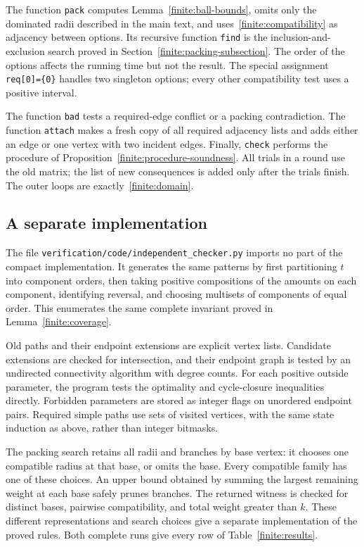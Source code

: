 The function \texttt{pack} computes
Lemma~\ref{finite:ball-bounds}, omits only the dominated radii described
in the main text, and uses~\eqref{finite:compatibility} as adjacency
between options. Its recursive function \texttt{find} is the
inclusion-and-exclusion search proved in Section~\ref{finite:packing-subsection}.
The order of the options affects the running time but not the result.
The special assignment \texttt{req[0]=\{0\}} handles two singleton
options; every other compatibility test uses a positive interval.

The function \texttt{bad} tests a required-edge conflict or a packing
contradiction. The function \texttt{attach} makes a fresh copy of all
required adjacency lists and adds either an edge or one vertex with
two incident edges. Finally, \texttt{check} performs the procedure of
Proposition~\ref{finite:procedure-soundness}. All trials in a round use
the old matrix; the list of new consequences is added only after the
trials finish. The outer loops are exactly~\eqref{finite:domain}.

\subsection{A separate implementation}

The file \texttt{verification/code/independent\_checker.py} imports no part of the
compact implementation. It generates the same patterns by first
partitioning $t$ into component orders, then taking positive
compositions of the amounts on each component, identifying reversal,
and choosing multisets of components of equal order. This enumerates
the same complete invariant proved in Lemma~\ref{finite:coverage}.

Old paths and their endpoint extensions are explicit vertex lists.
Candidate extensions are checked for intersection, and their endpoint
graph is tested by an undirected connectivity algorithm with degree
counts. For each positive outside parameter, the program tests the
optimality and cycle-closure inequalities directly. Forbidden parameters
are stored as integer flags on unordered endpoint pairs. Required
simple paths use sets of visited vertices, with the same state induction
as above, rather than integer bitmasks.

The packing search retains all radii and branches by base vertex: it
chooses one compatible radius at that base, or omits the base. Every
compatible family has one of these choices. An upper bound obtained
by summing the largest remaining weight at each base safely prunes
branches. The returned witness is checked for distinct bases, pairwise
compatibility, and total weight greater than $k$.
These different representations and search choices give a separate
implementation of the proved rules. Both complete runs give every row
of Table~\ref{finite:results}.

